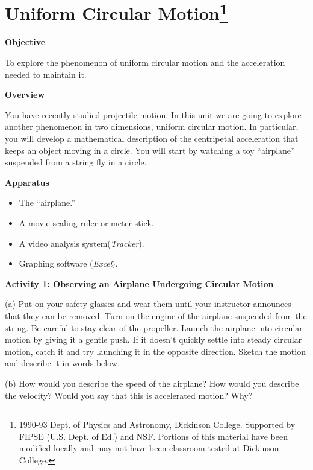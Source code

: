 
\section{Uniform Circular Motion\footnote{
1990-93 Dept. of Physics and Astronomy, Dickinson College. Supported by FIPSE
(U.S. Dept. of Ed.) and NSF. Portions of this material have been modified locally
and may not have been classroom tested at Dickinson College.
}}

\makelabheader %

\textbf{Objective }

To explore the phenomenon of uniform circular motion and the acceleration needed
to maintain it.

\textbf{Overview} 

You have recently studied projectile motion. In this unit we are going to explore
another phenomenon in two dimensions, uniform circular motion. In particular,
you will develop a mathematical description of the centripetal acceleration
that keeps an object moving in a circle. You will start by watching a toy ``airplane''
suspended from a string fly in a circle.

\textbf{Apparatus}

\begin{itemize}
\item The ``airplane.''
\item A movie scaling ruler or meter stick.
\item A video analysis system(\textit{Tracker}). 
\item Graphing software (\textit{Excel}).
\end{itemize}
\textbf{Activity 1: Observing an Airplane Undergoing Circular Motion} 

(a) Put on your safety glasses and wear them until your instructor announces
that they can be removed. Turn on the engine of the airplane suspended from
the string. Be careful to stay clear of the propeller. Launch the airplane into
circular motion by giving it a gentle push. If it doesn't quickly settle into
steady circular motion, catch it and try launching it in the opposite direction.
Sketch the motion and describe it in words below. 
\vspace{30mm}

(b) How would you describe the speed of the airplane? How would you
describe the velocity? Would you say that this is accelerated motion? Why?
\vspace{20mm}

